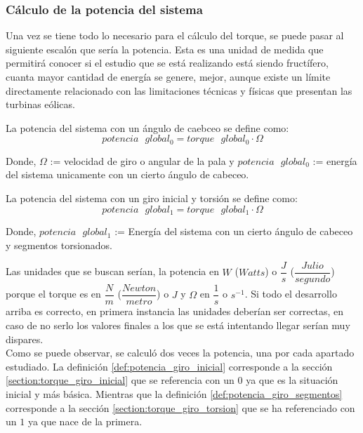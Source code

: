 \subsubsection{Cálculo de la potencia del sistema}
\label{section:pot_sistema}
 
 Una vez se tiene todo lo necesario para el cálculo del torque, se puede pasar al siguiente escalón que sería la potencia. Esta es una unidad de medida que permitirá conocer si el estudio que se está realizando está siendo fructífero, cuanta mayor cantidad de energía se genere, mejor, aunque existe un límite directamente relacionado con las limitaciones técnicas y físicas que presentan las turbinas eólicas. \\
 
  \begin{definicion}
 La potencia del sistema con un ángulo de caebceo se define como:
 $$ potencia \text{ } global_0 = torque \text{ } global_0 \cdot \Omega $$ 
 
 Donde,
  \centering $\Omega$ := velocidad de giro o angular de la pala y $potencia \text{ } global_0$ := energía del sistema unicamente con un cierto ángulo de cabeceo.
 \label{def:potencia_giro_inicial}
 \end{definicion}
 
   \begin{definicion}
 La potencia del sistema con un giro inicial y torsión se define como:
 $$ potencia \text{ } global_1 = torque \text{ } global_1 \cdot \Omega $$ 
 
 Donde,
 \centering $potencia \text{ } global_1$ := Energía del sistema con un cierto ángulo de cabeceo y segmentos torsionados.
 \label{def:potencia_giro_segmentos}
 \end{definicion}
 
 
Las unidades que se buscan serían, la potencia en $W$ ($Watts$) o $\dfrac{J}{s}$ ($\dfrac{Julio}{segundo}$) porque el torque es en $\dfrac{N}{m}$ ($\dfrac{Newton}{metro}$) o $J$ y $\Omega$ en $\dfrac{1}{s}$ o $s^{-1}$. Si todo el desarrollo arriba es correcto, en primera instancia las unidades deberían ser correctas, en caso de no serlo los valores finales a los que se está intentando llegar serían muy dispares. \\

 
 Como se puede observar, se calculó dos veces la potencia, una por cada apartado estudiado. La definición \ref{def:potencia_giro_inicial} corresponde a la sección \ref{section:torque_giro_inicial} que se referencia con un $0$ ya que es la situación inicial y más básica. Mientras que la definición \ref{def:potencia_giro_segmentos} corresponde a la sección \ref{section:torque_giro_torsion} que se ha referenciado con un $1$ ya que nace de la primera.
 
